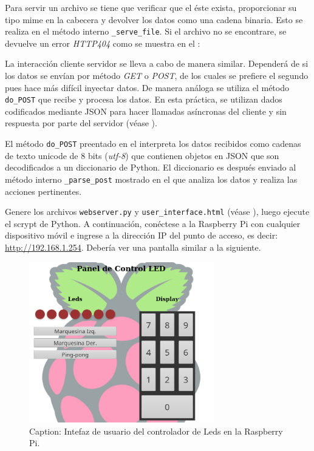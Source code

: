 \documentclass[letterpaper,10.5pt]{article}
\begin{document}
Para servir un archivo se tiene que verificar que el éste exista, proporcionar su tipo mime en la cabecera y devolver los datos como una cadena binaria.
Esto se realiza en el método interno \texttt{\_serve\_file}.
Si el archivo no se encontrare, se devuelve un error \emph{HTTP404} como se muestra en el :



La interacción cliente servidor se lleva a cabo de manera similar.
Dependerá de si los datos se envían por método \emph{GET} o \emph{POST}, de los cuales se prefiere el segundo pues hace más difícil inyectar datos.
De manera análoga se utiliza el método \texttt{do\_POST} que recibe y procesa los datos.
En esta práctica, se utilizan dados codificados mediante JSON para hacer llamadas asíncronas del cliente y sin respuesta por parte del servidor (véase ).



El método \texttt{do\_POST} preentado en el  interpreta los datos recibidos como cadenas de texto unicode de 8 bits (\emph{utf-8}) que contienen objetos en JSON que son decodificados a un diccionario de Python.
El diccionario es después enviado al método interno \texttt{\_parse\_post} mostrado en el  que analiza los datos y realiza las acciones pertinentes.



Genere los archivos \texttt{webserver.py} y \texttt{user\_interface.html} (véase ), luego ejecute el scrypt de Python.
A continuación, conéctese a la Raspberry Pi con cualquier dispositivo móvil e ingrese a la dirección IP del punto de acceso, es decir: \url{http://192.168.1.254}.
Debería ver una pantalla similar a la siguiente.

\begin{figure}[H]
	\centering
	\includegraphics[height=7cm,keepaspectratio]{img/screenshot-ui.png}
	\caption{Caption: Intefaz de usuario del controlador de Leds en la Raspberry Pi.}
	\label{fig:hello-world} %
\end{figure}
\end{document}
